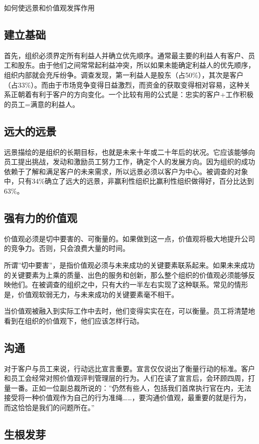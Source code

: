 \documentclass[11pt]{ctexart}
\begin{document}
如何使远景和价值观发挥作用
\subsection{建立基础}
\label{sec-86-1}


首先，组织必须界定所有利益人并确立优先顺序。通常最主要的利益人有客户、员工和股东。由于他们之间常常起利益冲突，所以如果未能确定利益人的优先顺序，组织内部就会充斥纷争。调查发现，第一利益人是股东（占50\%），其次是客户（占33\%）。而由于市场竞争变得日益激烈，而资金的获取变得相对容易，这种关系正朝着有利于客户的方向变化。一个比较有用的公式是：忠实的客户+工作积极的员工=满意的利益人。
\subsection{远大的远景}
\label{sec-86-2}


远景描绘的是组织的长期目标，也就是未来十年或二十年后的状况。它应该能够向员工提出挑战，发动和激励员工努力工作，确定个人的发展方向。因为组织的成功依赖于了解和满足客户的未来需求，所以远景必须以客户为中心。被调查的对象中，只有34\%确立了远大的远景，非赢利性组织比赢利性组织做得好，百分比达到63\%。
\subsection{强有力的价值观}
\label{sec-86-3}


价值观必须是切中要害的、可衡量的。如果做到这一点，价值观将极大地提升公司的竞争力。否则，只会浪费大量的时间。

所谓''切中要害''，是指价值观必须与未来成功的关键要素联系起来。如果未来成功的关键要素为上乘的质量、出色的服务和创新，那么整个组织的价值观必须能够反映他们。在被调查的组织之中，只有大约一半左右实现了这种联系。常见的情形是，价值观软弱无力，与未来成功的关键要素毫不相干。

当价值观被融入到实际工作中去时，他们变得实实在在，可以衡量。员工将清楚地看到在组织的价值观下，他们应该怎样行动。
\subsection{沟通}
\label{sec-86-4}


对于客户与员工来说，行动远比宣言重要。宣言仅仅说出了衡量行动的标准。客户和员工会经常对照价值观评判管理层的行为。人们在读了宣言后，会环顾四周，打量一番。正如一位副总裁所说的：''仍然有些人，包括我们首席执行官在内，无法接受将一种价值观作为自己的行为准绳……，要沟通价值观，最重要的就是行为，而这恰恰是我们的问题所在。''
\subsection{生根发芽}
\label{sec-86-5}
\end{document}
